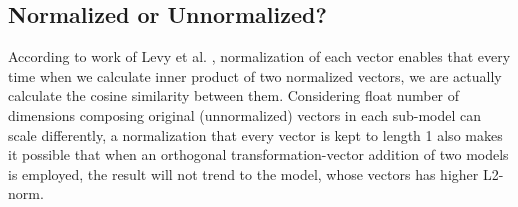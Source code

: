 \subsection{Normalized or Unnormalized?}
According to work of Levy et al. \cite{levy2015improving}, normalization of each vector enables that every time when we calculate inner product of two normalized vectors, we are actually calculate the cosine similarity between them. Considering float number of dimensions composing original (unnormalized) vectors in each sub-model can scale differently, a normalization that every vector is kept to length 1 also makes it possible that when an orthogonal transformation-vector addition of two models is employed, the result will not trend to the model, whose vectors has higher L2-norm.

